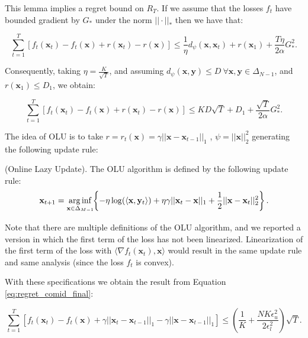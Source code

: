 This lemma implies a regret bound on $R_T$. If we assume that the losses $f_t$ have bounded gradient by $G_*$ under the norm $||\cdot||_*$ then we have that: 

\begin{equation}
\sum\limits_{t=1}^T[f_t(\mathbf x_t)-f_t(\mathbf x)+r(\mathbf x_t)-r(\mathbf x)]\le\frac{1}{\eta}d_\psi(\mathbf x,\mathbf x_t)+r(\mathbf x_1)+\frac{T\eta}{2\alpha}G_*^2.
\end{equation}

Consequently, taking $\eta=\frac{K}{\sqrt T}$, and assuming $d_\psi(\mathbf x,\mathbf y)\le D\ \forall\mathbf x,\mathbf y\in\Delta_{N-1}$, and $r(\mathbf x_1)\le D_1$, we obtain:

\begin{equation}\label{eq:regret_comid_final}
\sum\limits_{t=1}^T[f_t(\mathbf x_t)-f_t(\mathbf x)+r(\mathbf x_t)-r(\mathbf x)]\le KD\sqrt{T} + D_1+\frac{\sqrt{T}}{2\alpha}G_*^2.
\end{equation}

The idea of OLU is to take $r=r_t(\mathbf x)=\gamma||\mathbf x-\mathbf x_{t-1}||_1$ \cite{das2014online}, $\psi=||\mathbf x||_2^2$ generating the following update rule:

\begin{definition}(Online Lazy Update).\label{def:update_OLU}
The OLU algorithm is defined by the following update rule:
\begin{equation}\label{eq:update_OLU}
    \mathbf{x}_{t+1}=\arginf\limits_{\mathbf{x} \in \Delta_{M-1}} \hspace{-0.1cm} \left\{ -\eta\log(\langle \mathbf x,\mathbf y_t\rangle) + \eta \gamma ||\mathbf x_t-\mathbf x||_1 + \frac{1}{2}||\mathbf x-\mathbf x_t||^2_2 \right\}.
\end{equation}

\end{definition}

Note that there are multiple definitions of the OLU algorithm, and we reported a version in which the first term of the loss has not been linearized. Linearization of the first term of the loss with $\langle\nabla f_t(\mathbf x_t),\mathbf x\rangle$ would result in the same update rule and same analysis (since the loss $f_t$ is convex).

With these specifications we obtain the result from Equation \eqref{eq:regret_comid_final}:

\begin{equation}
\sum\limits_{t=1}^T[f_t(\mathbf x_t)-f_t(\mathbf x)+\gamma||\mathbf x_t-\mathbf x_{t-1}||_1-\gamma||\mathbf x-\mathbf x_{t-1}||_1]\le \left( \frac{1}{K} + \frac{N K \epsilon_u^2 }{2 \epsilon_l^2} \right) \sqrt{T}.
\end{equation}

